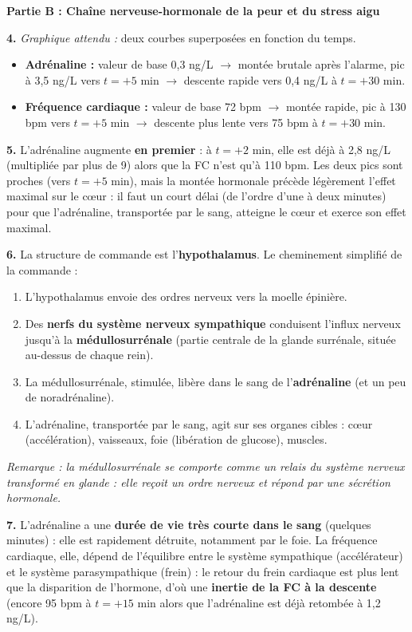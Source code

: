 \documentclass[11pt]{article}
\begin{document}
\begin{exoresolu}
\textbf{Partie B : Chaîne nerveuse-hormonale de la peur et du stress aigu}

\textbf{4.} \emph{Graphique attendu :} deux courbes superposées en fonction du temps.
\begin{itemize}
    \item \textbf{Adrénaline :} valeur de base 0,3 ng/L $\rightarrow$ montée brutale après l'alarme, pic à 3,5 ng/L vers $t = +5$ min $\rightarrow$ descente rapide vers 0,4 ng/L à $t = +30$ min.
    \item \textbf{Fréquence cardiaque :} valeur de base 72 bpm $\rightarrow$ montée rapide, pic à 130 bpm vers $t = +5$ min $\rightarrow$ descente plus lente vers 75 bpm à $t = +30$ min.
\end{itemize}

\textbf{5.} L'adrénaline augmente \textbf{en premier} : à $t = +2$ min, elle est déjà à 2,8 ng/L (multipliée par plus de 9) alors que la FC n'est qu'à 110 bpm. Les deux pics sont proches (vers $t = +5$ min), mais la montée hormonale précède légèrement l'effet maximal sur le cœur : il faut un court délai (de l'ordre d'une à deux minutes) pour que l'adrénaline, transportée par le sang, atteigne le cœur et exerce son effet maximal.

\textbf{6.} La structure de commande est l'\textbf{hypothalamus}. Le cheminement simplifié de la commande :
\begin{enumerate}
    \item L'hypothalamus envoie des ordres nerveux vers la moelle épinière.
    \item Des \textbf{nerfs du système nerveux sympathique} conduisent l'influx nerveux jusqu'à la \textbf{médullosurrénale} (partie centrale de la glande surrénale, située au-dessus de chaque rein).
    \item La médullosurrénale, stimulée, libère dans le sang de l'\textbf{adrénaline} (et un peu de noradrénaline).
    \item L'adrénaline, transportée par le sang, agit sur ses organes cibles : cœur (accélération), vaisseaux, foie (libération de glucose), muscles.
\end{enumerate}
\emph{Remarque : la médullosurrénale se comporte comme un relais du système nerveux transformé en glande : elle reçoit un ordre nerveux et répond par une sécrétion hormonale.}

\textbf{7.} L'adrénaline a une \textbf{durée de vie très courte dans le sang} (quelques minutes) : elle est rapidement détruite, notamment par le foie. La fréquence cardiaque, elle, dépend de l'équilibre entre le système sympathique (accélérateur) et le système parasympathique (frein) : le retour du frein cardiaque est plus lent que la disparition de l'hormone, d'où une \textbf{inertie de la FC à la descente} (encore 95 bpm à $t = +15$ min alors que l'adrénaline est déjà retombée à 1,2 ng/L).


\end{exoresolu}
\end{document}
